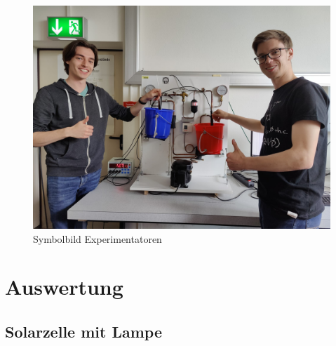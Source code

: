 \documentclass[english, ngerman]{scrartcl}
\begin{document}
%
\begin{figure}[H]
    \centering
    \begin{samepage}
        \includegraphics[width=0.6\linewidth]{fig/Spass1.jpeg}
        \caption[Symbolbild Experimentatoren]{Symbolbild Experimentatoren}
        \label{fig:umruehren}
    \end{samepage}
\end{figure}



\section{Auswertung}
\label{sec:auswertung}

\subsection{Solarzelle mit Lampe}
\label{subsec:auswertung_solar_lampe}
\end{document}
